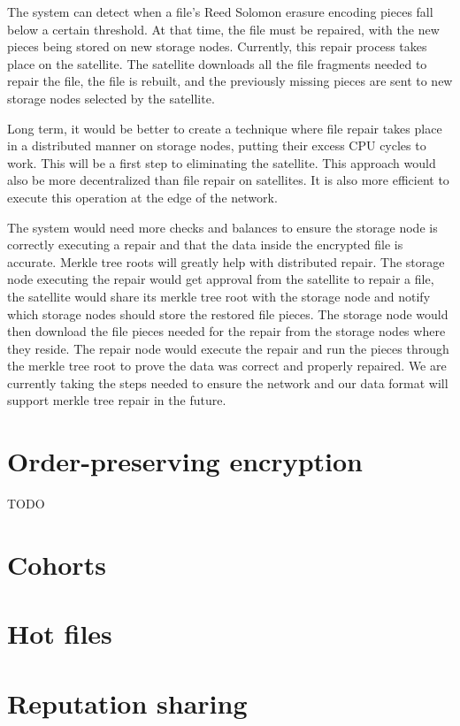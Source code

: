\documentclass[11pt,fleqn,openany]{book}
\newcommand{\todo}[1]{{\color{red} TODO #1 }}
\begin{document}
The system can detect when a file's Reed Solomon erasure encoding pieces fall
below a certain threshold. At that time, the file must be repaired, with
the new pieces being stored on new storage nodes.
Currently, this
repair process takes place on the satellite. The satellite downloads all
the file fragments needed to repair the file, the file is rebuilt, and the
previously missing pieces are sent to new storage nodes
selected by the satellite.

Long term, it would be better to create a technique where file repair takes
place in a distributed manner on storage nodes, putting their excess CPU
cycles
to work. This will be a first step to eliminating the satellite. This
approach would also be more decentralized than file repair on satellites. It
is also more efficient to execute this operation at the edge of the network.

The system would need more checks and balances to ensure the storage node is
correctly
executing a repair and that the data inside the encrypted file is accurate.
Merkle tree roots will greatly help with distributed repair. The storage
node
executing the repair would get approval from the satellite to repair a file,
the satellite would share its merkle tree root with the storage node and
notify
which storage nodes should store the restored file pieces. The storage node
would then
download the file pieces needed for the repair from the storage nodes where they
reside. The repair node would execute the repair and run the pieces
through the merkle tree root to prove the data was correct and properly
repaired. We are currently taking the steps needed to ensure the network and our
data format will support merkle tree repair in the future.

\section{Order-preserving encryption}

\todo{}

\section{Cohorts}
\section{Hot files}
\section{Reputation sharing}
\end{document}
